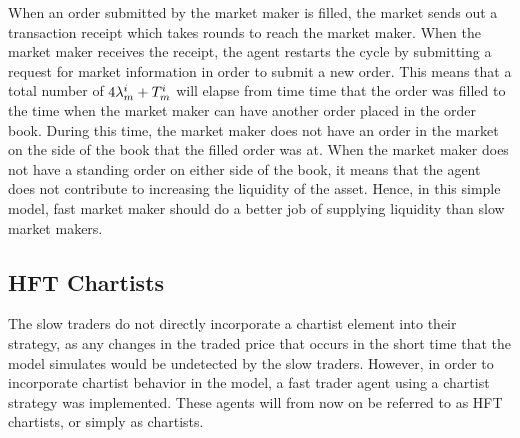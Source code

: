 When an order submitted by the market maker is filled, the market sends out a transaction receipt which takes  rounds to reach the market maker. When the market maker receives the receipt, the agent restarts the cycle by submitting a request for market information in order to submit a new order. This means that a total number of $4\lambda_m^{i} + T_m^{i}$ will elapse from time time that the order was filled to the time when the market maker can have another order placed in the order book. During this time, the market maker does not have an order in the market on the side of the book that the filled order was at. When the market maker does not have a standing order on either side of the book, it means that the agent does not contribute to increasing the liquidity of the asset. Hence, in this simple model, fast market maker should do a better job of supplying liquidity than slow market makers.






\subsection{HFT Chartists}\label{section:hft_chartist}
The slow traders do not directly incorporate a chartist element into their strategy, as any changes in the traded price that occurs in the short time that the model simulates would be undetected by the slow traders. However, in order to incorporate chartist behavior in the model, a fast trader agent using a chartist strategy was implemented. These agents will from now on be referred to as HFT chartists, or simply as chartists. 
